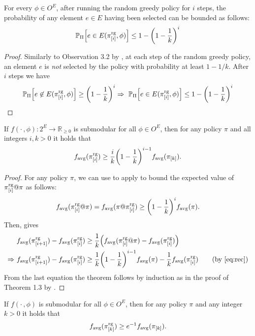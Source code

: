 \begin{lemma}\label{lem:sel}
  For every $\phi \in O^E$, after running the random greedy policy for $i$ steps, the probability of any element $e \in E$ having been selected can be bounded  as follows:
\begin{align*}
  \P[\Pi]{e \in E(\pigi, \phi)} \leq 1 - \left(1 - \frac{1}{k}\right)^i
\end{align*}
\end{lemma}
\begin{proof}
  Similarly to Observation 3.2 by \citet{buchbinder14}, at each step of the random greedy policy, an element $e$ is \emph{not} selected by the policy with probability at least $1 - 1/k$. After $i$ steps we have
  \begin{align*}
    \P[\Pi]{e \not\in E(\pigi, \phi)} \geq \left(1 - \frac{1}{k}\right)^i \Rightarrow\ \P[\Pi]{e \in E(\pigi, \phi)} \leq 1 - \left(1 - \frac{1}{k}\right)^i
  \end{align*}
\end{proof}

\begin{theorem}
  If $f(\cdot\,, \phi) : 2^E \to \mathbb{R}_{\geq 0}$ is submodular for all $\phi \in O^E$, then for any policy $\pi$ and all integers $i, k > 0$ it holds that
  \begin{align*}
    \favg(\pigi) \geq \frac{i}{k}\left(1 - \frac{1}{k}\right)^{i-1}\favg(\pik).
  \end{align*}
\end{theorem}
\begin{proof}
  For any policy $\pi$, we can use  to apply  to bound the expected value of $\pi^{\textrm{rg}}_{[i]} @ \pi$ as follows:
  \begin{align}\label{eq:rec}
    \favg(\pigi @ \pi) = \favg(\pi @ \pigi) \geq \left(1 - \frac{1}{k}\right)^i \favg(\pi).
  \end{align}
  Then,  gives
  \begin{align*}
    &\favg(\pigii) - \favg(\pigi) \geq \frac{1}{k}\left(\favg(\pigi @ \pi) - \favg(\pigi)\right)\\
    \Rightarrow\ &\favg(\pigii) - \favg(\pigi) \geq \frac{1}{k}\left(1 - \frac{1}{k}\right)^{i-1}\favg(\pi) - \frac{1}{k}\favg(\pigi) \tag*{(by \eqref{eq:rec})}
  \end{align*}
  From the last equation the theorem follows by induction as in the proof of Theorem 1.3 by \citet{buchbinder14}.
\end{proof}

\begin{cor}
  If $f(\cdot\,, \phi)$ is submodular for all $\phi \in O^E$, then for any policy $\pi$ and any integer $k > 0$ it holds that
  \begin{align*}
    f_{\mathrm{avg}}(\pi^{\textrm{rg}}_{[k]}) \geq e^{-1}f_{\mathrm{avg}}(\pi_{[k]}).
  \end{align*}
\end{cor}
